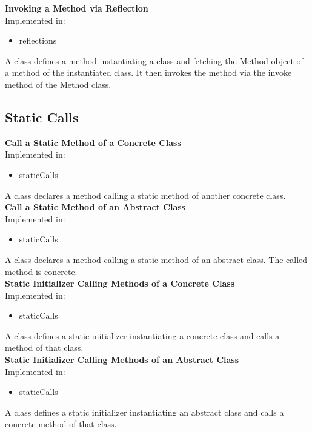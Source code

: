 \documentclass{article}
\begin{document}
\noindent
\textbf{Invoking a Method via Reflection}\\
Implemented in: 
\begin{itemize}
    \item reflections
\end{itemize}
A class defines a method instantiating a class and fetching the Method object of a method of the instantiated class. It then invokes the method via the invoke method of the Method class.\\

\subsection{Static Calls}

\textbf{Call a Static Method of a Concrete Class}\\
Implemented in: 
\begin{itemize}
    \item staticCalls
\end{itemize}
A class declares a method calling a static method of another concrete class.\\

\noindent
\textbf{Call a Static Method of an Abstract Class}\\
Implemented in: 
\begin{itemize}
    \item staticCalls
\end{itemize}
A class declares a method calling a static method of an abstract class. The called method is concrete.\\

\noindent
\textbf{Static Initializer Calling Methods of a Concrete Class}\\
Implemented in: 
\begin{itemize}
    \item staticCalls
\end{itemize}
A class defines a static initializer instantiating a concrete class and calls a method of that class.\\

\noindent
\textbf{Static Initializer Calling Methods of an Abstract Class}\\
Implemented in: 
\begin{itemize}
    \item staticCalls
\end{itemize}
A class defines a static initializer instantiating an abstract class and calls a concrete method of that class.\\
\end{document}

